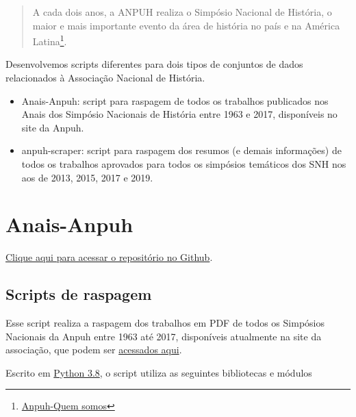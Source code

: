 \documentclass[
]{book}
\begin{document}
\begin{quote}
A cada dois anos, a ANPUH realiza o Simpósio Nacional de História, o maior e mais importante evento da área de história no país e na América Latina\footnote{\href{https://anpuh.org.br/index.php/quem-somos}{Anpuh-Quem somos}}.
\end{quote}

Desenvolvemos scripts diferentes para dois tipos de conjuntos de dados relacionados à Associação Nacional de História.

\begin{itemize}
\item
  Anais-Anpuh: script para raspagem de todos os trabalhos publicados nos Anais dos Simpósio Nacionais de História entre 1963 e 2017, disponíveis no site da Anpuh.
\item
  anpuh-scraper: script para raspagem dos resumos (e demais informações) de todos os trabalhos aprovados para todos os simpósios temáticos dos SNH nos aos de 2013, 2015, 2017 e 2019.
\end{itemize}

\hypertarget{anais-anpuh}{%
\section{Anais-Anpuh}\label{anais-anpuh}}

\href{https://github.com/LABHDUFBA/Anais-Anpuh}{Clique aqui para acessar o repositório no Github}.

\hypertarget{scripts-de-raspagem}{%
\subsection{Scripts de raspagem}\label{scripts-de-raspagem}}

Esse script realiza a raspagem dos trabalhos em PDF de todos os Simpósios Nacionais da Anpuh entre 1963 até 2017, disponíveis atualmente na site da associação, que podem ser \href{https://anpuh.org.br/index.php/documentos/anais}{acessados aqui}.

Escrito em \href{https://www.python.org/}{Python 3.8}, o script utiliza as seguintes bibliotecas e módulos
\end{document}

